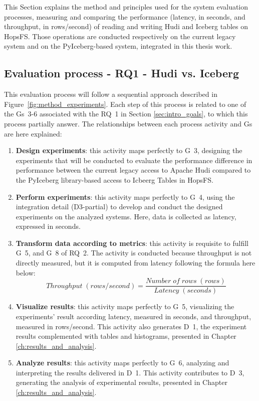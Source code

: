 This Section explains the method and principles used for the system evaluation processes, measuring and comparing the performance (latency, in seconds, and throughput, in rows/second) of reading and writing Hudi and Iceberg tables on \gls{HopsFS}. Those operations are conducted respectively on the current legacy system and on the PyIceberg-based system, integrated in this thesis work.

\subsection{Evaluation process - RQ1 - Hudi vs. Iceberg}
\label{subsec:eval_process_hudi_iceberg}
This evaluation process will follow a sequential approach described in Figure~\ref{fig:method_experiments}. Each step of this process is related to one of the \glspl{G}~3-6 associated with the \gls{RQ}~1 in Section \ref{sec:intro_goals}, to which this process partially answer. The relationships between each process activity and \glspl{G} are here explained:
\begin{enumerate}
    \item \textbf{Design experiments}: this activity maps perfectly to \gls{G}~3, designing the experiments that will be conducted to evaluate the performance difference in performance between the current legacy access to Apache Hudi compared to the PyIceberg library-based access to Icbeerg Tables in \gls{HopsFS}. 
    \item \textbf{Perform experiments}: this activity maps perfectly to \gls{G}~4, using the integration detail (\gls{D}3-partial) to develop and conduct the designed experiments on the analyzed systems. Here, data is collected as latency, expressed in seconds.
    \item \textbf{Transform data according to metrics}: this activity is requisite to fulfill \gls{G}~5, and \gls{G}~8 of \gls{RQ}~2. The activity is conducted because throughput is not directly measured, but it is computed from latency following the formula here below:
    \[ Throughput \; (rows/second) = \frac{Number \; of \; rows \; (rows)}{Latency \;(seconds)}\]
    \item \textbf{Visualize results}: this activity maps perfectly to \gls{G}~5, visualizing the experiments' result according latency, measured in seconds, and throughput, measured in rows/second. This activity also generates \gls{D}~1, the experiment results complemented with tables and histograms, presented in Chapter \ref{ch:results_and_analysis}.
    \item \textbf{Analyze results}: this activity maps perfectly to \gls{G}~6, analyzing and interpreting the results delivered in \gls{D}~1. This activity contributes to \gls{D}~3, generating the analysis of experimental results, presented in Chapter \ref{ch:results_and_analysis}.
\end{enumerate}
